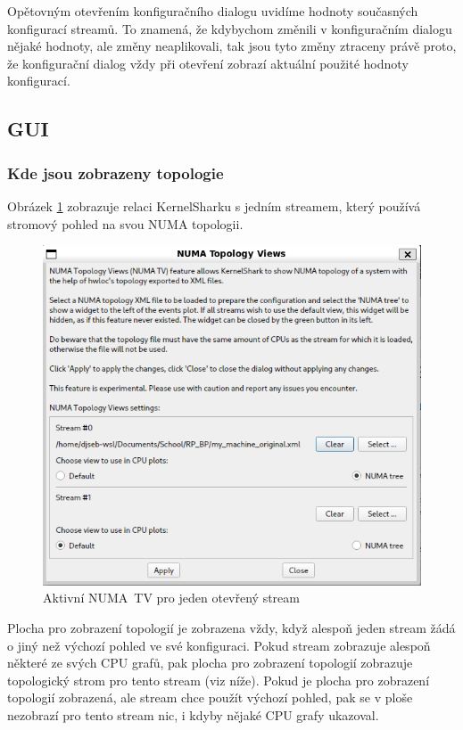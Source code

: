 Opětovným otevřením konfiguračního dialogu uvidíme hodnoty současných konfigurací streamů. To znamená, že kdybychom změnili v konfiguračním dialogu nějaké hodnoty, ale změny neaplikovali, tak jsou tyto změny ztraceny právě proto, že konfigurační dialog vždy při otevření zobrazí aktuální použité hodnoty konfigurací.

\subsection{GUI}

\subsubsection{Kde jsou zobrazeny topologie}

Obrázek \ref{numatv-3} zobrazuje relaci KernelSharku s jedním streamem, který používá stromový pohled na svou NUMA topologii.

\begin{figure}[p]\centering
    \includegraphics[width=140mm]{img/NUMATV/numatv-3}
    \caption{Aktivní NUMA~TV pro jeden otevřený stream}
    \label{numatv-3}
\end{figure}

Plocha pro zobrazení topologií je zobrazena vždy, když alespoň jeden stream žádá o jiný než výchozí pohled ve své konfiguraci. Pokud stream zobrazuje alespoň některé ze svých CPU grafů, pak plocha pro zobrazení topologií zobrazuje topologický strom pro tento stream (viz níže). Pokud je plocha pro zobrazení topologií zobrazená, ale stream chce použít výchozí pohled, pak se v ploše nezobrazí pro tento stream nic, i kdyby nějaké CPU grafy ukazoval.

